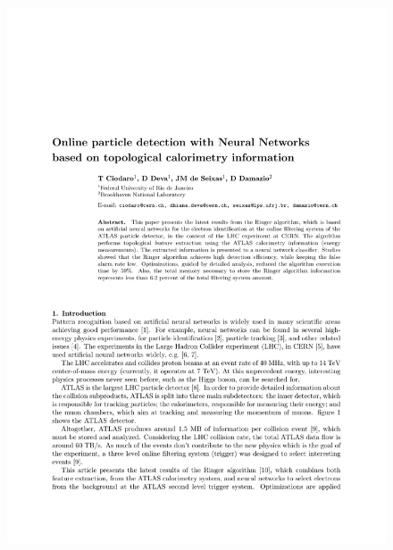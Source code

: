 \documentclass[a4paper,10pt,titlepage]{article}
\begin{document}
\begin{figure}[htbp!]
 \includegraphics[scale=0.8,keepaspectratio=true,clip=true,trim=50px 400px 50px 200px]{Figs/abstracts/acat_2011/proceedings_final_30042012.pdf}
\end{figure}
\end{document}
